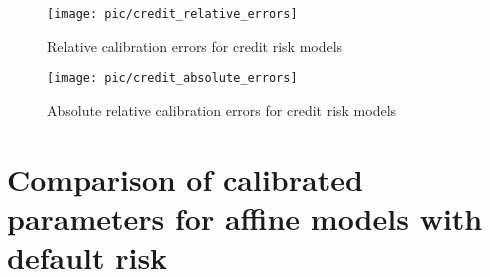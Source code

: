 \begin{figure}[H]
	\centering
	\texttt{[image: pic/credit\_relative\_errors]}
	\caption{Relative calibration errors for credit risk models}
	\label{fig:credit_relative_errors}
\end{figure}

\begin{figure}[H]
	\centering
	\texttt{[image: pic/credit\_absolute\_errors]}
	\caption{Absolute relative calibration errors for credit risk models}
	\label{fig:credit_absolute_errors}
\end{figure}

\section{Comparison of calibrated parameters for affine models with default risk}

\label{default parameter_comparision}

